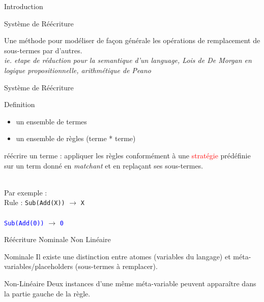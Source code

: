 




\begin{frame}{Introduction}

  \begin{block}{Système de Réécriture}

    Une méthode pour modéliser de façon générale les opérations de
    remplacement de sous-termes par d'autres.
    ~\\

    \emph{ie. etape de réduction pour la semantique d'un language,
      Lois de De Morgan en logique propositionnelle, arithmétique de Peano}
    
  \end{block}

  
\end{frame}

\begin{frame}{Système de Réécriture}

  \begin{block}{Definition}
    
    \begin{itemize}
      \item un ensemble de termes 
      \item un ensemble de règles (terme * terme)
    \end{itemize}

  \end{block}

  réécrire un terme : appliquer les règles conformément à une
  \textcolor{red}{stratégie} prédéfinie sur un term donné en
  \emph{matchant} et en replaçant ses sous-termes.

  ~\\
  Par exemple : \\
  Rule : \texttt{Sub(Add(X))} $\rightarrow$ \texttt{X}\\
  ~\\
  \textcolor{blue}{\texttt{Sub(Add(0))}} $ \rightarrow $ \textcolor{blue}{\texttt{0}}

\end{frame}


\begin{frame}{Réécriture Nominale Non Linéaire}
  
  \begin{block}{Nominale}
    Il existe une distinction entre atomes (variables du langage) et
    méta-variables/placeholders (sous-termes à remplacer).
  \end{block}

  \begin{block}{Non-Linéaire}
    Deux instances d'une même méta-variable peuvent apparaître dans la
    partie gauche de la règle.
  \end{block}
  
\end{frame}



